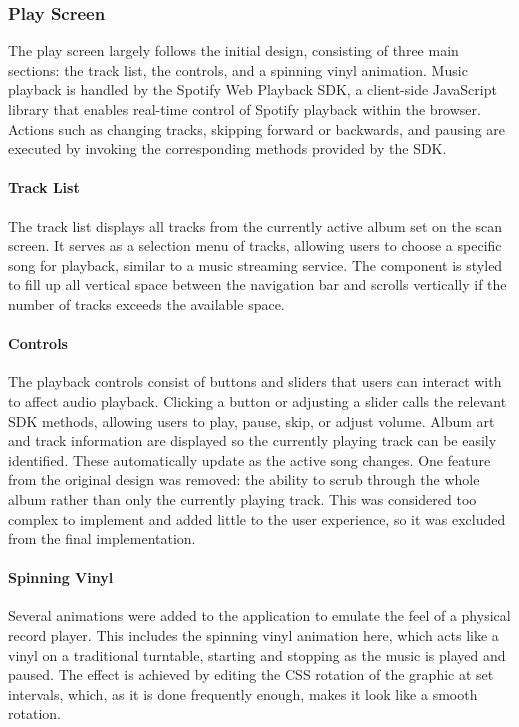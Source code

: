 \subsubsection{Play Screen}
The play screen largely follows the initial design, consisting of three main sections: the track list, the controls, and a spinning vinyl animation. Music playback is handled by the Spotify Web Playback SDK, a client-side JavaScript library that enables real-time control of Spotify playback within the browser. Actions such as changing tracks, skipping forward or backwards, and pausing are executed by invoking the corresponding methods provided by the SDK.

\paragraph{Track List}
The track list displays all tracks from the currently active album set on the scan screen. It serves as a selection menu of tracks, allowing users to choose a specific song for playback, similar to a music streaming service. The component is styled to fill up all vertical space between the navigation bar and scrolls vertically if the number of tracks exceeds the available space.

\paragraph{Controls}
The playback controls consist of buttons and sliders that users can interact with to affect audio playback. Clicking a button or adjusting a slider calls the relevant SDK methods, allowing users to play, pause, skip, or adjust volume. Album art and track information are displayed so the currently playing track can be easily identified. These automatically update as the active song changes.
One feature from the original design was removed: the ability to scrub through the whole album rather than only the currently playing track. This was considered too complex to implement and added little to the user experience, so it was excluded from the final implementation.

\paragraph{Spinning Vinyl}
Several animations were added to the application to emulate the feel of a physical record player. This includes the spinning vinyl animation here, which acts like a vinyl on a traditional turntable, starting and stopping as the music is played and paused. The effect is achieved by editing the CSS rotation of the graphic at set intervals, which, as it is done frequently enough, makes it look like a smooth rotation.

